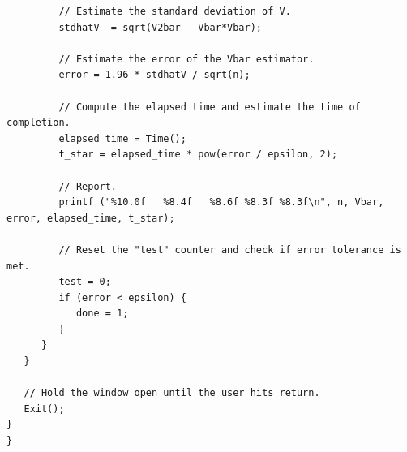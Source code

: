 \documentclass{report}
\begin{document}
\begin{lstlisting}
         // Estimate the standard deviation of V.
         stdhatV  = sqrt(V2bar - Vbar*Vbar);

         // Estimate the error of the Vbar estimator.
         error = 1.96 * stdhatV / sqrt(n);

         // Compute the elapsed time and estimate the time of completion.
         elapsed_time = Time();
         t_star = elapsed_time * pow(error / epsilon, 2);

         // Report.
         printf ("%10.0f   %8.4f   %8.6f %8.3f %8.3f\n", n, Vbar, error, elapsed_time, t_star);

         // Reset the "test" counter and check if error tolerance is met.
         test = 0;
         if (error < epsilon) {
            done = 1;
         }
      }
   }

   // Hold the window open until the user hits return.
   Exit();
}
}
\end{lstlisting}

\pagebreak
\end{document}
